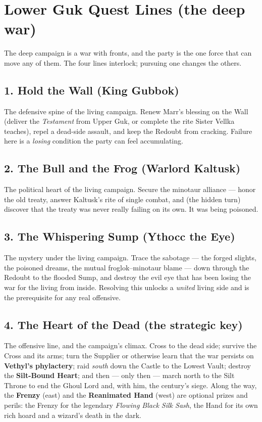 \documentclass[10pt,twoside]{report}
\begin{document}
\section{Lower Guk Quest Lines (the deep war)}
The deep campaign is a war with fronts, and the party is the one force that can move any of them. The four lines interlock; pursuing one changes the others.

\subsection*{1. Hold the Wall (King Gubbok)}
The defensive spine of the living campaign. Renew Marr's blessing on the Wall (deliver the \emph{Testament} from Upper Guk, or complete the rite Sister Vellka teaches), repel a dead-side assault, and keep the Redoubt from cracking. Failure here is a \emph{losing} condition the party can feel accumulating.

\subsection*{2. The Bull and the Frog (Warlord Kaltusk)}
The political heart of the living campaign. Secure the minotaur alliance --- honor the old treaty, answer Kaltusk's rite of single combat, and (the hidden turn) discover that the treaty was never really failing on its own. It was being poisoned.

\subsection*{3. The Whispering Sump (Ythocc the Eye)}
The mystery under the living campaign. Trace the sabotage --- the forged slights, the poisoned dreams, the mutual froglok--minotaur blame --- down through the Redoubt to the flooded Sump, and destroy the evil eye that has been losing the war for the living from inside. Resolving this unlocks a \emph{united} living side and is the prerequisite for any real offensive.

\subsection*{4. The Heart of the Dead (the strategic key)}
The offensive line, and the campaign's climax. Cross to the dead side; survive the Cross and its arms; turn the Supplier or otherwise learn that the war persists on \textbf{Vethyl's phylactery}; raid \emph{south} down the Castle to the Lowest Vault; destroy the \textbf{Silt-Bound Heart}; and then --- only then --- march north to the Silt Throne to end the Ghoul Lord and, with him, the century's siege. Along the way, the \textbf{Frenzy} (east) and the \textbf{Reanimated Hand} (west) are optional prizes and perils: the Frenzy for the legendary \emph{Flowing Black Silk Sash}, the Hand for its own rich hoard and a wizard's death in the dark.
\end{document}
